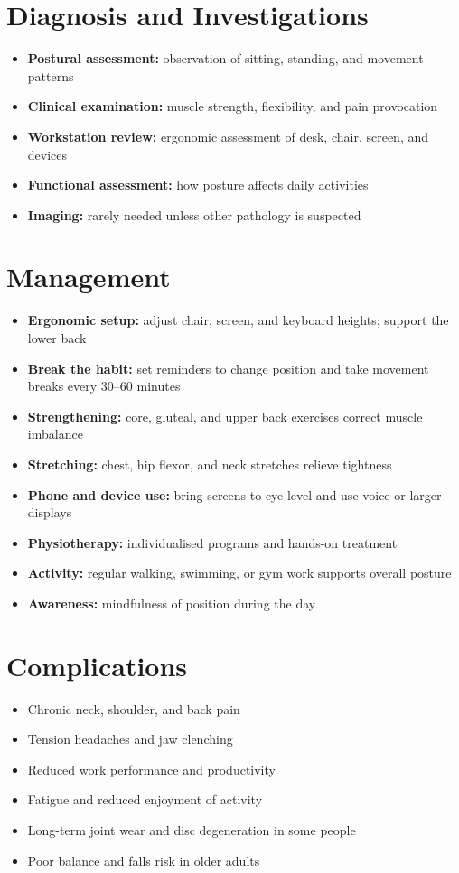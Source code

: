 \section*{Diagnosis and Investigations}
\begin{itemize}
    \item \textbf{Postural assessment:} observation of sitting, standing, and movement patterns
    \item \textbf{Clinical examination:} muscle strength, flexibility, and pain provocation
    \item \textbf{Workstation review:} ergonomic assessment of desk, chair, screen, and devices
    \item \textbf{Functional assessment:} how posture affects daily activities
    \item \textbf{Imaging:} rarely needed unless other pathology is suspected
\end{itemize}

\section*{Management}
\begin{itemize}
    \item \textbf{Ergonomic setup:} adjust chair, screen, and keyboard heights; support the lower back
    \item \textbf{Break the habit:} set reminders to change position and take movement breaks every 30--60 minutes
    \item \textbf{Strengthening:} core, gluteal, and upper back exercises correct muscle imbalance
    \item \textbf{Stretching:} chest, hip flexor, and neck stretches relieve tightness
    \item \textbf{Phone and device use:} bring screens to eye level and use voice or larger displays
    \item \textbf{Physiotherapy:} individualised programs and hands-on treatment
    \item \textbf{Activity:} regular walking, swimming, or gym work supports overall posture
    \item \textbf{Awareness:} mindfulness of position during the day
\end{itemize}

\section*{Complications}
\begin{itemize}
    \item Chronic neck, shoulder, and back pain
    \item Tension headaches and jaw clenching
    \item Reduced work performance and productivity
    \item Fatigue and reduced enjoyment of activity
    \item Long-term joint wear and disc degeneration in some people
    \item Poor balance and falls risk in older adults
\end{itemize}

